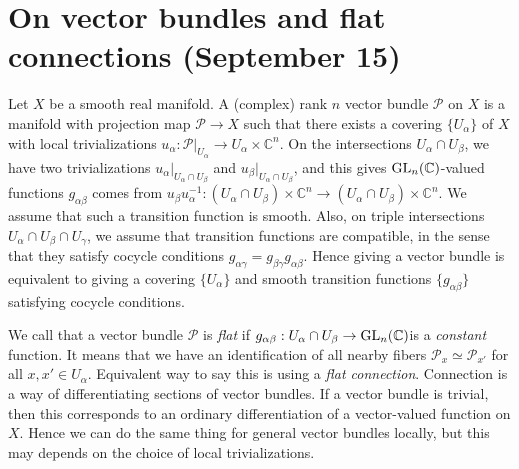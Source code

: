 \newpage
\section{On vector bundles and flat connections (September 15)}


Let $X$ be a smooth real manifold.
A (complex) rank $n$ vector bundle $\mathcal{P}$ on $X$ is a manifold with projection map $\mathcal{P} \to X$ such that
there exists a covering $\{ U_{\alpha}\}$ of $X$ with local trivializations $u_{\alpha}: \mathcal{P}|_{U_\alpha} \to U_\alpha \times \mathbb{C}^{n}$.
On the intersections $U_\alpha \cap U_\beta$, we have two trivializations
$u_\alpha|_{U_\alpha \cap U_\beta}$ and $u_\beta|_{U_\alpha \cap U_\beta}$, and this gives $\operatorname{\mathrm{GL}}_n(\mathbb{C})$-valued functions
$g_{\alpha\beta}$ comes from $u_{\beta}u_{\alpha}^{-1}: (U_\alpha \cap U_\beta) \times \mathbb{C}^n \to (U_\alpha\cap U_\beta)\times\mathbb{C}^n$.
We assume that such a transition function is smooth. Also, on triple intersections $U_\alpha \cap U_\beta \cap U_\gamma$, 
we assume that transition functions are compatible, in the sense that they satisfy cocycle conditions $g_{\alpha\gamma} = g_{\beta\gamma}g_{\alpha \beta}$.
Hence giving a vector bundle is equivalent to giving a covering $\{U_\alpha\}$ and smooth transition functions $\{g_{\alpha\beta}\}$
satisfying cocycle conditions.

We call that a vector bundle $\mathcal{P}$ is \emph{flat} if $g_{\alpha\beta}:U_{\alpha}\cap U_{\beta}\to \operatorname{\mathrm{GL}}_n(\mathbb{C})$is a \emph{constant} function.
It means that we have an identification of all nearby fibers $\mathcal{P}_{x} \simeq \mathcal{P}_{x'}$ for all $x, x'\in U_\alpha$.
Equivalent way to say this is using a \emph{flat connection}.
Connection is a way of differentiating sections of vector bundles.
If a vector bundle is trivial, then this corresponds to an ordinary differentiation of a vector-valued function on $X$.
Hence we can do the same thing for general vector bundles locally, but this may depends on the choice of local trivializations.


